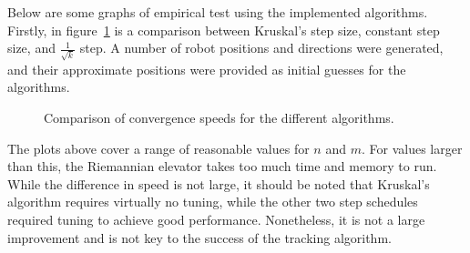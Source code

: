 Below are some graphs of empirical test using the implemented algorithms. Firstly, in figure~\ref{fig:kruskal} is a comparison between Kruskal's step size, constant step size, and $\frac{1}{\sqrt{k}}$ step. A number of robot positions and directions were generated, and their approximate positions were provided as initial guesses for the algorithms. 
\begin{figure}[ht]
    \centering
    
    \caption{Comparison of convergence speeds for the different algorithms.}
    \label{fig:kruskal}
\end{figure}
The plots above cover a range of reasonable values for $n$ and $m$. For values larger than this, the Riemannian elevator takes too much time and memory to run. While the difference in speed is not large, it should be noted that Kruskal's algorithm requires virtually no tuning, while the other two step schedules required tuning to achieve good performance. Nonetheless, it is not a large improvement and is not key to the success of the tracking algorithm. 

